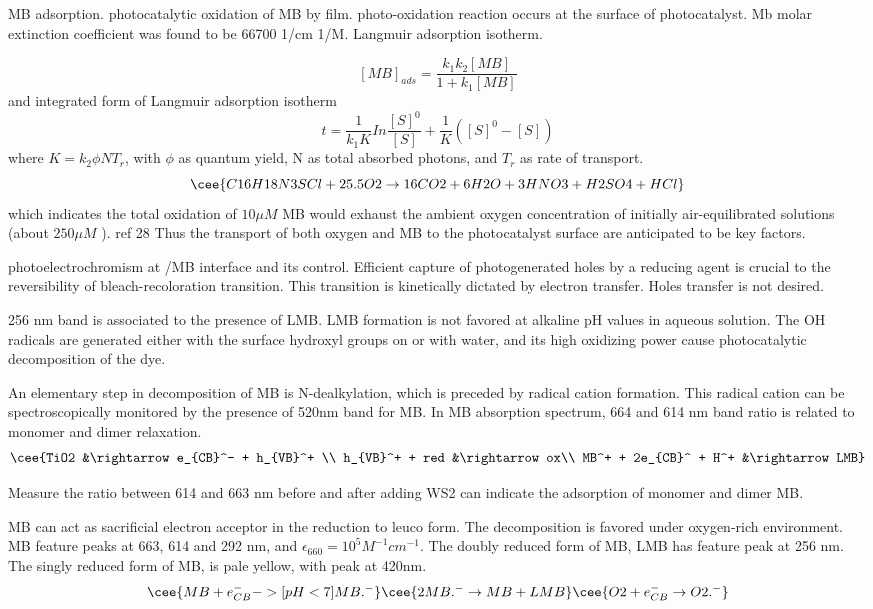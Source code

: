 MB adsorption.  photocatalytic oxidation of MB by  film. photo-oxidation reaction occurs at the surface of photocatalyst. Mb molar extinction coefficient was found to be 66700 1/cm 1/M. Langmuir adsorption isotherm.\cite{Matthews1989}

\[
[MB]_{ads} = \frac{k_1 k_2 [MB]}{1 + k_1[MB]}
\]
and integrated form of Langmuir adsorption isotherm
\[
t = \frac{1}{k_1K} In\frac{[S]^0}{[S]} + \frac{1}{K}([S]^0 - [S])
\]
where $K = k_2 \phi N T_r$, with $\phi$ as quantum yield, N as total absorbed photons, and $T_r$ as rate of transport.
\[
\cee{C16H18N3SCl + 25.5O2 \rightarrow 16CO2 + 6H2O + 3HNO3 + H2SO4 +HCl}
\]
which indicates the total oxidation of $10 \mu M$ MB would exhaust the ambient oxygen concentration of initially air-equilibrated solutions (about $250 \mu M$ ). ref 28 Thus the transport of both oxygen and MB to the photocatalyst surface are anticipated to be key factors.

photoelectrochromism at /MB interface and its control. Efficient capture of photogenerated holes by a reducing agent is crucial to the reversibility of bleach-recoloration transition. This transition is kinetically dictated by electron transfer. Holes transfer is not desired.\cite{DeTacconi1997}

256 nm band is associated to the presence of LMB. LMB formation is not favored at alkaline pH values in aqueous solution. The OH radicals are generated either with the surface hydroxyl groups on  or with water, and its high oxidizing power cause photocatalytic decomposition of the dye.

An elementary step in decomposition of MB is N-dealkylation, which is preceded by radical cation formation.\cite{Takizawa1978} This radical cation can be spectroscopically monitored by the presence of 520nm band for MB. In MB absorption spectrum, 664 and 614 nm band ratio is related to monomer and dimer relaxation.
\begin{align}
\cee{TiO2 &\rightarrow e_{CB}^- + h_{VB}^+ \\
h_{VB}^+ + red &\rightarrow ox\\
MB^+ + 2e_{CB}^ + H^+ &\rightarrow LMB}
\end{align}

Measure the ratio between 614 and 663 nm before and after adding WS2 can indicate the adsorption of monomer and dimer MB.

MB can act as sacrificial electron acceptor in the reduction to leuco form. The decomposition is favored under oxygen-rich environment. MB feature peaks at 663, 614 and 292 nm, and $\epsilon_{660}=10^5 M^{-1}cm^{-1}$. The doubly reduced form of MB, LMB has feature peak at 256 nm. The singly reduced form of MB,  is pale yellow, with peak at 420nm.\cite{Mills1999}
\[
\cee{MB + e_{CB}^- ->[pH<7] MB.^-}
\cee{2MB.^- \rightarrow MB + LMB}
\cee{O2 + e_{CB}^- \rightarrow O2.^-}
\]

